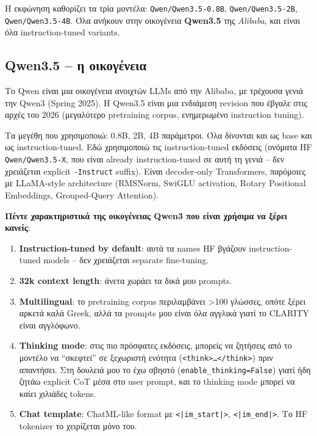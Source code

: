 \documentclass[12pt]{fphw}
\begin{document}
Η εκφώνηση καθορίζει τα τρία μοντέλα: \texttt{Qwen/Qwen3.5-0.8B}, \texttt{Qwen/Qwen3.5-2B}, \texttt{Qwen/Qwen3.5-4B}. Όλα ανήκουν στην οικογένεια \textbf{Qwen3.5} της \emph{Alibaba}, και είναι όλα instruction-tuned variants.

\subsection{Qwen3.5 -- η οικογένεια}

Το Qwen \cite{qwen3technical} είναι μια οικογένεια ανοιχτών LLMs από την Alibaba, με τρέχουσα γενιά την Qwen3 (Spring 2025). Η Qwen3.5 είναι μια ενδιάμεση revision που έβγαλε στις αρχές του 2026 (μεγαλύτερο pretraining corpus, ενημερωμένο instruction tuning).

Τα μεγέθη που χρησιμοποιώ: 0.8B, 2B, 4B παράμετροι. Όλα δίνονται και ως base και ως instruction-tuned. Εδώ χρησιμοποιώ τις instruction-tuned εκδόσεις (ονόματα HF \texttt{Qwen/Qwen3.5-X}, που είναι already instruction-tuned σε αυτή τη γενιά -- δεν χρειάζεται explicit \texttt{-Instruct} suffix). Είναι decoder-only Transformers, παρόμοιες με LLaMA-style architecture (RMSNorm, SwiGLU activation, Rotary Positional Embeddings, Grouped-Query Attention).

\textbf{Πέντε χαρακτηριστικά της οικογένειας Qwen3 που είναι χρήσιμα να ξέρει κανείς}:

\begin{enumerate}
    \item \textbf{Instruction-tuned by default}: αυτά τα names HF βγάζουν instruction-tuned models -- δεν χρειάζεται separate fine-tuning.
    \item \textbf{32k context length}: άνετα χωράει τα δικά μου prompts.
    \item \textbf{Multilingual}: το pretraining corpus περιλαμβάνει >100 γλώσσες, οπότε ξέρει αρκετά καλά Greek, αλλά τα prompts μου είναι όλα αγγλικά γιατί το CLARITY είναι αγγλόφωνο.
    \item \textbf{Thinking mode}: στις πιο πρόσφατες εκδόσεις, μπορείς να ζητήσεις από το μοντέλο να ``σκεφτεί'' σε ξεχωριστή ενότητα (\texttt{<think>\dots</think>}) πριν απαντήσει. Στη δουλειά μου το έχω σβηστό (\texttt{enable\_thinking=False}) γιατί ήδη ζητάω explicit CoT μέσα στο user prompt, και το thinking mode μπορεί να καίει χιλιάδες tokens.
    \item \textbf{Chat template}: ChatML-like format με \texttt{<|im\_start|>}, \texttt{<|im\_end|>}. Το HF tokenizer το χειρίζεται μόνο του.
\end{enumerate}
\end{document}
